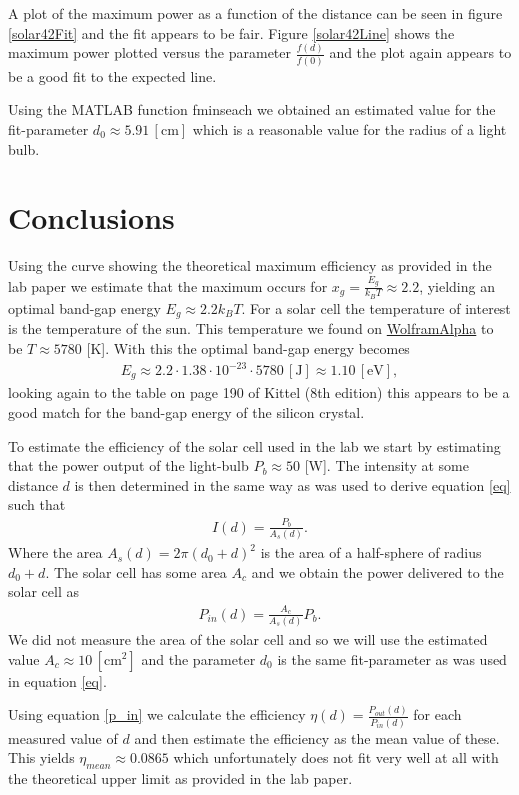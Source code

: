 \documentclass[a4paper]{article}
\begin{document}
A plot of the maximum power as a function of the distance can be seen in figure \ref{solar42Fit} and the fit appears to be fair. Figure \ref{solar42Line} shows the maximum power plotted versus the parameter $\frac{f(d)}{f(0)}$ and the plot again appears to be a good fit to the expected line.

Using the MATLAB function fminseach we obtained an estimated value for the fit-parameter $d_0 \approx 5.91 \,\mathrm{[cm]}$ which is a reasonable value for the radius of a light bulb.



\section{Conclusions}

Using the curve showing the theoretical maximum efficiency as provided in the lab paper we estimate that the maximum occurs for $x_g = \frac{E_g}{k_B T} \approx 2.2$, yielding an optimal band-gap energy $E_g \approx 2.2 k_B T$. For a solar cell the temperature of interest is the temperature of the sun. This temperature we found on \href{https://www.wolframalpha.com/input/?i=temperature+of+the+sun}{WolframAlpha} to be $T \approx 5780$ [K]. With this the optimal band-gap energy becomes 
\begin{align}
	E_g \approx 2.2 \cdot 1.38 \cdot 10^{-23} \cdot 5780 \,\mathrm{[J]} \approx 1.10 \,\mathrm{[eV]},
\end{align}
looking again to the table on page 190 of Kittel (8th edition) this appears to  be a good match for the band-gap energy of the silicon crystal.

To estimate the efficiency of the solar cell used in the lab we start by estimating that the power output of the light-bulb $P_b \approx 50$ [W]. The intensity at some distance $d$ is then determined in the same way as was used to derive equation \ref{eq} such that
\begin{align}
	I(d) = \frac{P_b}{A_s(d)}.
\end{align}
Where the area $A_s(d) = 2 \pi (d_0 + d)^2$ is the area of a half-sphere of radius $d_0 + d$. The solar cell has some area $A_c$ and we obtain the power delivered to the solar cell as
\begin{align}\label{p_in}
	P_{in}(d) = \frac{A_c}{A_s(d)}P_b.
\end{align}
We did not measure the area of the solar cell and so we will use the estimated value $A_c \approx 10 \, [\mathrm{cm^2}]$ and the parameter $d_0$ is the same fit-parameter as was used in equation \ref{eq}.

Using equation \ref{p_in} we calculate the efficiency $\eta(d) = \frac{P_{out}(d)}{P_{in}(d)}$ for each measured value of $d$ and then estimate the efficiency as the mean value of these. This yields $\eta_{mean} \approx 0.0865$ which unfortunately does not fit very well at all with the theoretical upper limit as provided in the lab paper. 
\end{document}
